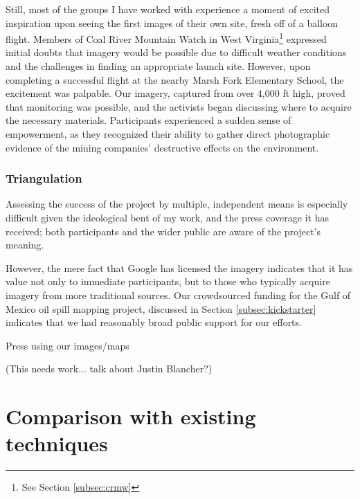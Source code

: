 \documentclass[11pt,oneside,notitlepage]{report}
\begin{document}
Still, most of the groups I have worked with experience a moment of excited inspiration upon seeing the first images of their own site, fresh off of a balloon flight. Members of Coal River Mountain Watch in West Virginia\footnote{See Section \ref{subsec:crmw}} expressed initial doubts that imagery would be possible due to difficult weather conditions and the challenges in finding an appropriate launch site. However, upon completing a successful flight at the nearby Marsh Fork Elementary School, the excitement was palpable. Our imagery, captured from over 4,000 ft high, proved that monitoring was possible, and the activists began discussing where to acquire the necessary materials. Participants experienced a sudden sense of empowerment, as they recognized their ability to gather direct photographic evidence of the mining companies' destructive effects on the environment. 

\subsubsection{Triangulation}

Assessing the success of the project by multiple, independent means is especially difficult given the ideological bent of my work, and the press coverage it has received; both participants and the wider public are aware of the project's meaning. 

However, the mere fact that Google has licensed the imagery indicates that it has value not only to immediate participants, but to those who typically acquire imagery from more traditional sources. Our crowdsourced funding for the Gulf of Mexico oil spill mapping project, discussed in Section \ref{subsec:kickstarter} indicates that we had reasonably broad public support for our efforts.  

Press using our images/maps

(This needs work... talk about Justin Blancher?)

\section{Comparison with existing techniques}
\end{document}
